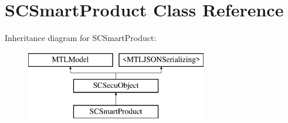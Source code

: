 \hypertarget{interface_s_c_smart_product}{}\section{S\+C\+Smart\+Product Class Reference}
\label{interface_s_c_smart_product}
Inheritance diagram for S\+C\+Smart\+Product\+:\begin{figure}[H]
\begin{center}
\leavevmode
\includegraphics[height=3.000000cm]{interface_s_c_smart_product}
\end{center}
\end{figure}
